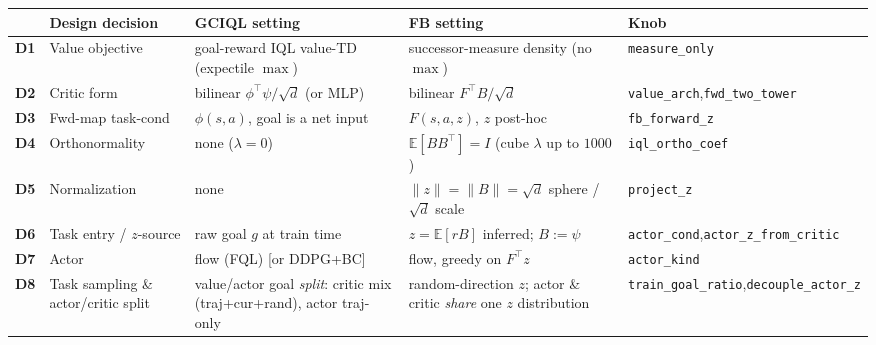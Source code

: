 \documentclass[11pt]{article}
\newcommand{\B}[1]{\textbf{#1}}
\begin{document}
\begin{center}\scriptsize
\renewcommand{\arraystretch}{1.3}
\setlength{\tabcolsep}{3pt}
\begin{tabularx}{\linewidth}{@{}c >{\raggedright\arraybackslash}p{1.9cm} Y Y >{\raggedright\arraybackslash}p{2.75cm}@{}}
\toprule
 & \B{Design decision} & \B{GCIQL setting} & \B{FB setting} & \B{Knob} \\
\midrule
\B{D1} & Value objective & goal-reward IQL value-TD (expectile $\max$) & successor-measure density (no $\max$) & \texttt{measure\_only} \\
\B{D2} & Critic form & bilinear $\phi^\top\psi/\sqrt d$ (or MLP) & bilinear $F^\top B/\sqrt d$ & \texttt{value\_arch},\newline\texttt{fwd\_two\_tower} \\
\B{D3} & Fwd-map task-cond & $\phi(s,a)$, goal is a net input & $F(s,a,z)$, $z$ post-hoc & \texttt{fb\_forward\_z} \\
\B{D4} & Orthonormality & none ($\lambda{=}0$) & $\mathbb E[BB^\top]{=}I$ (cube $\lambda$ up to $1000$) & \texttt{iql\_ortho\_coef} \\
\B{D5} & Normalization & none & $\|z\|{=}\|B\|{=}\sqrt d$ sphere / $\sqrt d$ scale & \texttt{project\_z} \\
\B{D6} & Task entry / $z$-source & raw goal $g$ at train time & $z{=}\mathbb E[rB]$ inferred; $B{:=}\psi$ & \texttt{actor\_cond},\newline\texttt{actor\_z\_from\_critic} \\
\B{D7} & Actor & flow (FQL) [or DDPG+BC] & flow, greedy on $F^\top z$ & \texttt{actor\_kind} \\
\B{D8} & Task sampling \& actor/critic split & value/actor goal \emph{split}: critic mix (traj+cur+rand), actor traj-only & random-direction $z$; actor \& critic \emph{share} one $z$ distribution & \texttt{train\_goal\_ratio},\newline\texttt{decouple\_actor\_z} \\
\bottomrule
\end{tabularx}
\end{center}

\end{document}

